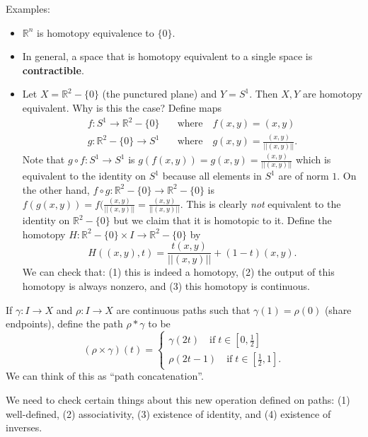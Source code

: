 \documentclass{article}
\newcommand{\nline}{\vspace*{0.5\baselineskip}}
\theoremstyle{definition}
\begin{document}
\begin{flushleft}
\nline

Examples:

\begin{itemize}
    \item $\mathbb{R}^n$ is homotopy equivalence to $\{0\}$.
    \item In general, a space that is homotopy equivalent to a single space is \textbf{contractible}.
    \item Let $X = \mathbb{R}^2 - \{0\}$ (the punctured plane) and $Y = S^1$. Then $X, Y$ are homotopy equivalent. Why is this the case? Define maps
    \[
    \begin{align}
        f : S^1 \to \mathbb{R}^2 - \{0\} \quad &\text{where} \quad f(x, y) = (x,y) \\
        g : \mathbb{R}^2 - \{0\} \to S^1 \quad &\text{where} \quad g(x, y) = \frac{(x,y)}{||(x,y)||}.
    \end{align}
    \]
    Note that $g \circ f : S^1 \to S^1$ is $g(f(x,y)) = g(x,y) = \frac{(x,y)}{||(x,y)||}$ which is equivalent to the identity on $S^1$ because all elements in $S^1$ are of norm $1$. On the other hand, $f \circ g : \mathbb{R}^2 - \{0\} \to \mathbb{R}^2 - \{0\}$ is $f(g(x,y)) = f(\frac{(x,y)}{||(x,y)||} = \frac{(x,y)}{||(x,y)||}$. This is clearly \textit{not} equivalent to the identity on $\mathbb{R}^2 - \{0\}$ but we claim that it is homotopic to it. Define the homotopy $H : \mathbb{R}^2 - \{0\} \times I \to \mathbb{R}^2 - \{0\}$ by
    \[
    H((x,y), t) = \frac{t(x,y)}{||(x,y)||} + (1 - t)(x,y).
    \]
    We can check that: (1) this is indeed a homotopy, (2) the output of this homotopy is always nonzero, and (3) this homotopy is continuous.
\end{itemize}

If $\gamma: I \to X$ and $\rho: I \to X$ are continuous paths such that $\gamma(1) = \rho(0)$ (share endpoints), define the path $\rho * \gamma$ to be
\[
(\rho \times \gamma)(t) = \begin{cases}
\gamma(2t) \quad \text{if} \; t \in [0,\frac{1}{2}] \\
\rho(2t - 1) \quad \text{if} \; t \in [\frac{1}{2}, 1].
\end{cases}
\]
We can think of this as ``path concatenation''.

\nline

We need to check certain things about this new operation defined on paths: (1) well-defined, (2) associativity, (3) existence of identity, and (4) existence of inverses.


\end{flushleft}
\end{document}
